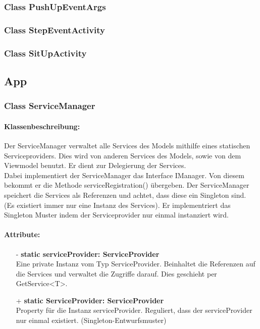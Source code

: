 \documentclass[a4paper,12pt]{article}
\begin{document}
	\subsubsection{Class PushUpEventArgs}
	\subsubsection{Class StepEventActivity}
	\subsubsection{Class SitUpActivity}
	

\subsection{App}
\subsubsection{Class ServiceManager}
	\paragraph{Klassenbeschreibung:}
	Der ServiceManager verwaltet alle Services des Models mithilfe eines statischen Serviceproviders. Dies wird von anderen Services des Models, sowie von dem Viewmodel benutzt. Er dient zur Delegierung der Services.\\ 
	Dabei implementiert der ServiceManager das Interface IManager.
	Von diesem bekommt er die Methode serviceRegistration() übergeben.
	Der ServiceManager speichert die Services als Referenzen und achtet, dass diese ein Singleton sind. (Es existiert immer nur eine Instanz des Services).
	Er implementriert das Singleton Muster indem der Serviceprovider nur einmal instanziert wird.
	
	\paragraph{Attribute:}
	\begin{itemize}
		\item[-] \textbf{static serviceProvider: ServiceProvider}\\Eine private Instanz vom Typ ServiceProvider. Beinhaltet die Referenzen auf die Services und verwaltet die Zugriffe darauf. Dies geschieht per GetService<T>.
		\item[+] \textbf{static ServiceProvider: ServiceProvider}\\Property für die Instanz serviceProvider. Reguliert, dass der serviceProvider nur einmal existiert. (Singleton-Entwurfsmuster)

	\end{itemize}
\end{document}
